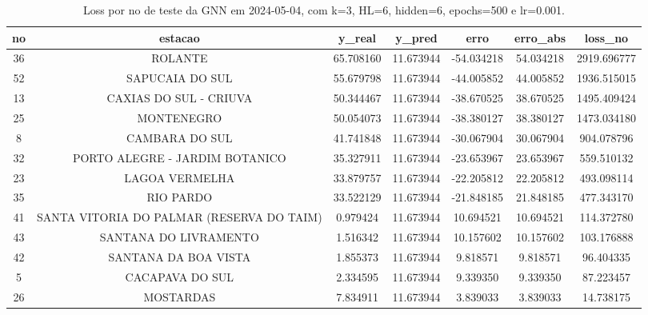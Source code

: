 \begin{table}[h]
\centering
\caption{Loss por no de teste da GNN em 2024-05-04, com k=3, HL=6, hidden=6, epochs=500 e lr=0.001.}
\label{tab:gnn_loss_k3_hl6_h6_e500_d20240504}
\begin{tabular}{ccccccc}
\toprule
no & estacao & y\_real & y\_pred & erro & erro\_abs & loss\_no \\
\midrule
36 & ROLANTE & 65.708160 & 11.673944 & -54.034218 & 54.034218 & 2919.696777 \\
52 & SAPUCAIA DO SUL & 55.679798 & 11.673944 & -44.005852 & 44.005852 & 1936.515015 \\
13 & CAXIAS DO SUL - CRIUVA & 50.344467 & 11.673944 & -38.670525 & 38.670525 & 1495.409424 \\
25 & MONTENEGRO & 50.054073 & 11.673944 & -38.380127 & 38.380127 & 1473.034180 \\
8 & CAMBARA DO SUL & 41.741848 & 11.673944 & -30.067904 & 30.067904 & 904.078796 \\
32 & PORTO ALEGRE - JARDIM BOTANICO & 35.327911 & 11.673944 & -23.653967 & 23.653967 & 559.510132 \\
23 & LAGOA VERMELHA & 33.879757 & 11.673944 & -22.205812 & 22.205812 & 493.098114 \\
35 & RIO PARDO & 33.522129 & 11.673944 & -21.848185 & 21.848185 & 477.343170 \\
41 & SANTA VITORIA DO PALMAR (RESERVA DO TAIM) & 0.979424 & 11.673944 & 10.694521 & 10.694521 & 114.372780 \\
43 & SANTANA DO LIVRAMENTO & 1.516342 & 11.673944 & 10.157602 & 10.157602 & 103.176888 \\
42 & SANTANA DA BOA VISTA & 1.855373 & 11.673944 & 9.818571 & 9.818571 & 96.404335 \\
5 & CACAPAVA DO SUL & 2.334595 & 11.673944 & 9.339350 & 9.339350 & 87.223457 \\
26 & MOSTARDAS & 7.834911 & 11.673944 & 3.839033 & 3.839033 & 14.738175 \\
\bottomrule
\end{tabular}
\end{table}
